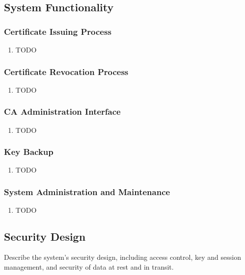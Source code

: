 \documentclass[english]{article}
\begin{document}
\subsection{System Functionality}


\subsubsection{Certificate Issuing Process}
\begin{enumerate}
\item TODO
\end{enumerate}

\subsubsection{Certificate Revocation Process}
\begin{enumerate}
\item TODO
\end{enumerate}

\subsubsection{CA Administration Interface}
\begin{enumerate}
\item TODO
\end{enumerate}

\subsubsection{Key Backup}
\begin{enumerate}
\item TODO
\end{enumerate}

\subsubsection{System Administration and Maintenance}
\begin{enumerate}
\item TODO
\end{enumerate}

\subsection{Security Design}

Describe the system's security design, including access control, key and session management,  and security of data at rest and in transit.
\end{document}
